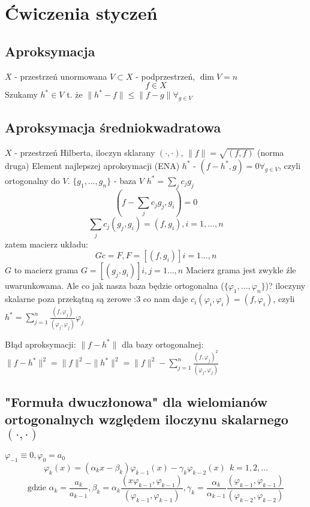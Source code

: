 \documentclass{article}
\begin{document}
\section{Ćwiczenia styczeń}
\subsection{Aproksymacja}
$X$ - przestrzeń unormowana
$V\subset X$ - podprzestrzeń, $ \dim V=n $
$$f\in X$$
Szukamy $h^*\in V$ t. że $ \|h^*-f\|\le \|f-g\|\forall_{g\in V} $
\subsection{Aproksymacja średniokwadratowa}
$ X $ - przestrzeń Hilberta, iloczyn sklarany $(\cdot, \cdot)$, $ \|f\|=\sqrt{(f, f)} $ (norma druga)
Element najlepszej aproksymacji (ENA) $ h^* $ - $ (f-h^*,g)=0 \forall_{g\in V} $, czyli ortogonalny do $ V $.
$ \{g_1, \dots, g_n\} $ - baza $ V $
$ h^*=\sum_j c_j g_j $
$$(f-\sum_j c_j g_j, g_i)=0$$
$$\sum_j c_j(g_j, g_i)=(f, g_i), i=1,\dots,n$$
zatem macierz układu:
$$Gc=F, F=[(f,g_i)]i=1\dots,n$$
$ G $ to macierz grama $ G=[(g_j,g_i)]i,j=1\dots,n $
Macierz grama jest zwykle źle uwarunkowama. Ale co jak nasza baza będzie ortogonalna ($ \{\varphi_1, \dots, \varphi_n\} $)? iloczyny skalarne poza przekątną są zerowe :3
co nam daje $ c_i(\varphi_i, \varphi_i)=(f, \varphi_i) $, czyli $ h^*=\sum_{j=1}^n \frac{(f,\varphi_j)}{(\varphi_j, \varphi_j)}\varphi_j$

Błąd aproksymacji: $ \|f-h^*\| $
dla bazy ortogonalnej:
$\|f-h^*\|^2=\|f\|^2-\|h^*\|^2=\|f\|^2-\sum_{j=1}^n \frac{(f,\varphi_j)^2}{(\varphi_j, \varphi_j)}$
\subsection{"Formuła dwuczłonowa" dla wielomianów ortogonalnych względem iloczynu skalarnego $ (\cdot, \cdot) $}
$\varphi_{-1}\equiv0,\varphi_0=a_0$
$$\varphi_k(x)=(\alpha_kx-\beta_k)\varphi_{k-1}(x)-\gamma_k\varphi_{k-2}(x)\ \  k=1,2,\dots$$
$$\text{gdzie } \alpha_k=\frac{a_k}{a_{k-1}}, \beta_k=\alpha_k\frac{(x\varphi_{k-1},\varphi_{k-1})}{(\varphi_{k-1},\varphi_{k-1})}, \gamma_k=\frac{\alpha_k}{\alpha_{k-1}}\frac{(\varphi_{k-1},\varphi_{k-1})}{(\varphi_{k-2},\varphi_{k-2})}$$
\end{document}

